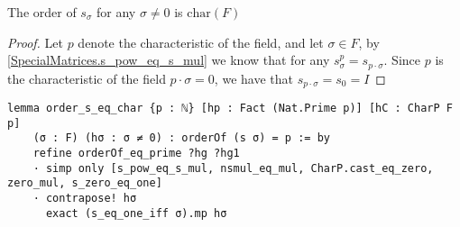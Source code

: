 \begin{lemma}
    \label{SpecialMatrices.order_s_eq_char}
    \leanok
    The order of $s_\sigma$ for any $\sigma \ne 0$ is $\textrm{char}(F)$
    \end{lemma}
    
    \begin{proof}
    \leanok
    Let $p$ denote the characteristic of the field, and let $\sigma \in F$, by \ref{SpecialMatrices.s_pow_eq_s_mul} we know that for any $s_\sigma^p = s_{p \cdot \sigma}$. 
    Since $p$ is the characteristic of the field $p \cdot \sigma = 0$, we have that $s_{p \cdot \sigma} = s_0 = I$
    \end{proof}
\begin{footnotesize}
\begin{verbatim}
lemma order_s_eq_char {p : ℕ} [hp : Fact (Nat.Prime p)] [hC : CharP F p]
    (σ : F) (hσ : σ ≠ 0) : orderOf (s σ) = p := by
    refine orderOf_eq_prime ?hg ?hg1
    · simp only [s_pow_eq_s_mul, nsmul_eq_mul, CharP.cast_eq_zero, zero_mul, s_zero_eq_one]
    · contrapose! hσ
      exact (s_eq_one_iff σ).mp hσ
\end{verbatim}
\end{footnotesize}

